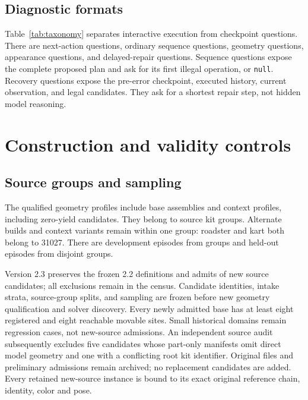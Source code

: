 \documentclass[10pt,twocolumn,letterpaper]{article}
\begin{document}
\subsection{Diagnostic formats}
Table~\ref{tab:taxonomy} separates interactive execution from checkpoint
questions. There are \NextActionCount{} next-action questions,
\ContinuationCount{} ordinary sequence questions,
\GeometryQuestionCount{} geometry questions,
\AppearanceQuestionCount{} appearance questions, and \RepairCount{}
delayed-repair questions. Sequence questions expose the complete proposed
plan and ask for its first illegal operation, or \texttt{null}.
Recovery questions expose the pre-error checkpoint, executed history,
current observation, and legal candidates. They ask for a shortest repair
step, not hidden model reasoning.

\section{Construction and validity controls}
\subsection{Source groups and sampling}
The \ProfileCount{} qualified geometry profiles include
\BaseProfileCount{} base assemblies and \ContextProfileCount{} context
profiles, including zero-yield candidates.
They belong to \SourceCount{} source kit groups. Alternate builds and
context variants remain within one group: roadster and kart both belong
to 31027. There are \DevelopmentEpisodeCount{} development episodes from
\DevelopmentSourceCount{} groups and \HeldoutEpisodeCount{} held-out
episodes from \HeldoutSourceCount{} disjoint groups.

Version 2.3 preserves the frozen 2.2 definitions and admits
\AdmittedCount{} of \CandidateCount{} new source candidates; all
\RejectedCount{} exclusions remain in the census. Candidate identities,
intake strata, source-group splits, and sampling are frozen before new
geometry qualification and solver discovery. Every newly admitted base
has at least eight registered and eight reachable movable sites.
Small historical domains remain regression cases, not new-source admissions.
An independent source audit subsequently excludes five candidates whose
part-only manifests omit direct model geometry and one with a conflicting
root kit identifier. Original files and preliminary admissions remain
archived; no replacement candidates are added. Every retained new-source instance
is bound to its exact original reference chain, identity, color and pose.
\end{document}

